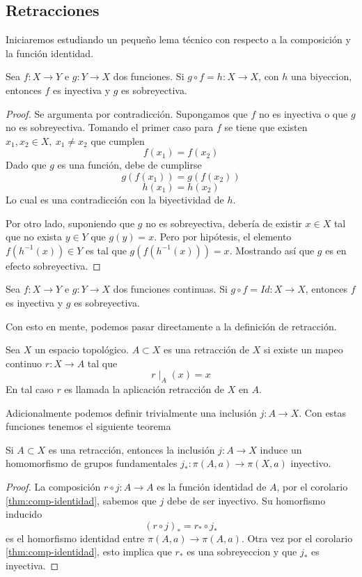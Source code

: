 \subsection{Retracciones}
Iniciaremos estudiando un pequeño lema técnico con respecto a la
composición y la función identidad.
\begin{lema}
  Sea \(f : X \to Y\) e \(g : Y \to X\) dos funciones. Si \( g \circ f =
  h : X \to X \), con \(h\) una biyeccion, entonces \(f\) es inyectiva y
  \(g\) es sobreyectiva.
\end{lema}
\begin{proof}
  Se argumenta por contradicción. Supongamos que \(f\) no es inyectiva o
  que \(g\) no es sobreyectiva. Tomando el primer caso para \(f\) se
  tiene que existen \(x_1 , x_2 \in X,\ x_1 \neq x_2\) que cumplen
  \[ f (x_1) = f(x_2) \]
  Dado que \(g\) es una función, debe de cumplirse
  \[ g (f (x_1)) = g (f(x_2)) \]
  \[ h (x_1) = h(x_2) \]
  Lo cual es una contradicción con la biyectividad de \(h\).

  Por otro lado, suponiendo que \(g\) no es sobreyectiva, debería de
  existir \(x \in X\) tal que no exista \( y \in Y\) que \(g (y) = x\).
  Pero por hipótesis, el elemento \(f(h^{-1}(x)) \in Y\) es tal que \(g
  (f (h^{-1}(x))) = x\). Mostrando así que \(g\) es en efecto
  sobreyectiva.
\end{proof}
\begin{corolario} \label{thm:comp-identidad}
  Sea \(f : X \to Y\) e \(g : Y \to X\) dos funciones continuas. Si \( g
  \circ f = Id : X \to X \), entonces \(f\) es inyectiva y \(g\) es
sobreyectiva.
\end{corolario}
\noindent Con esto en mente, podemos pasar directamente a la definición
de retracción.
\begin{definicion}
  Sea \(X\) un espacio topológico. \(A \subset X\) es una retracción de
  \(X\) si existe un mapeo continuo \(r : X \to A\) tal que
  \[ r \mid_{A} (x) = x \]
  En tal caso \(r\) es llamada la aplicación retracción de \(X\) en \(A\).
\end{definicion}
Adicionalmente podemos definir trivialmente una inclusión \(j : A \to
X\). Con estas funciones tenemos el siguiente teorema
\begin{teorema} \label{thm:retraccion-inclusion}
Si \(A \subset X\) es una retracción, entonces la inclusión \(j : A \to
X\) induce un homomorfismo de grupos fundamentales \(j_{*} : \pi(A, a)
\to \pi(X,a)\) inyectivo.
\end{teorema}
\begin{proof}
  La composición \(r \circ j : A \to A\) es la función identidad de
  \(A\), por el corolario \ref{thm:comp-identidad}, sabemos que \(j\)
  debe de ser inyectivo. Su homorfismo inducido
  \[ (r \circ j)_{*} = r_{*} \circ j_{*} \]
  es el homorfismo identidad entre \(\pi(A,a) \to \pi(A,a)\). Otra vez
  por el corolario \ref{thm:comp-identidad}, esto implica que \(r_{*}\)
  es una sobreyeccion y que \(j_{*}\) es inyectiva.
\end{proof}
